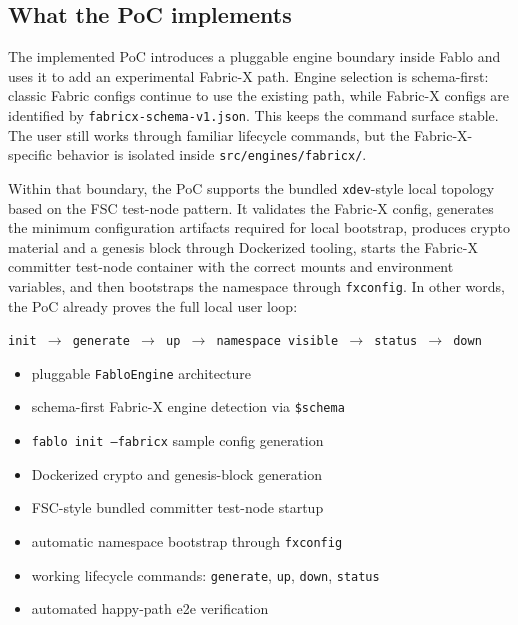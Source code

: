 \subsection{What the PoC implements}

The implemented PoC introduces a pluggable engine boundary inside Fablo and uses it to add an experimental Fabric-X path. Engine selection is schema-first: classic Fabric configs continue to use the existing path, while Fabric-X configs are identified by \texttt{fabricx-schema-v1.json}. This keeps the command surface stable. The user still works through familiar lifecycle commands, but the Fabric-X-specific behavior is isolated inside \texttt{src/engines/fabricx/}.

Within that boundary, the PoC supports the bundled \texttt{xdev}-style local topology based on the FSC test-node pattern. It validates the Fabric-X config, generates the minimum configuration artifacts required for local bootstrap, produces crypto material and a genesis block through Dockerized tooling, starts the Fabric-X committer test-node container with the correct mounts and environment variables, and then bootstraps the namespace through \texttt{fxconfig}. In other words, the PoC already proves the full local user loop:
\begin{center}
\texttt{init \(\rightarrow\) generate \(\rightarrow\) up \(\rightarrow\) namespace visible \(\rightarrow\) status \(\rightarrow\) down}
\end{center}

\begin{tcolorbox}[colback=gray!5!white, colframe=gray!50!black,
  title=PoC deliverables already implemented,
  fonttitle=\bfseries, arc=4pt]
\begin{itemize}[leftmargin=*]
  \item pluggable \texttt{FabloEngine} architecture
  \item schema-first Fabric-X engine detection via \texttt{\$schema}
  \item \texttt{fablo init --fabricx} sample config generation
  \item Dockerized crypto and genesis-block generation
  \item FSC-style bundled committer test-node startup
  \item automatic namespace bootstrap through \texttt{fxconfig}
  \item working lifecycle commands: \texttt{generate}, \texttt{up}, \texttt{down}, \texttt{status}
  \item automated happy-path e2e verification
\end{itemize}
\end{tcolorbox}

